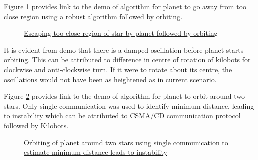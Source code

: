 \documentclass{report}[12pt]
\begin{document}
Figure \ref{fig:orbit_after_escape} provides link to the demo of algorithm for planet to go away from too close region using a robust algorithm followed by orbiting.
\begin{figure}[H]
	\centering
	\caption{\href{https://youtu.be/X6dGCLT0ho8}{Escaping too close region of star by planet followed by orbiting}}
	\label{fig:orbit_after_escape}
\end{figure}
It is evident from demo that there is a damped oscillation before planet starts orbiting. This can be attributed to difference in centre of rotation of kilobots for clockwise and anti-clockwise turn. If it were to rotate about its centre, the oscillations would not have been as heightened as in current scenario.

Figure \ref{fig:orbit_two_star_comm1} provides link to the demo of algorithm for planet to orbit around two stars. Only single communication was used to identify minimum distance, leading to instability which can be attributed to CSMA/CD \cite{WEBOPEDIA-csma-cd} communication protocol followed by Kilobots.
\begin{figure}[H]
	\centering
	\caption{\href{https://youtu.be/mhW04WvGKuQ}{Orbiting of planet around two stars using single communication to estimate minimum distance leads to instability}}
	\label{fig:orbit_two_star_comm1}
\end{figure}
\end{document}

